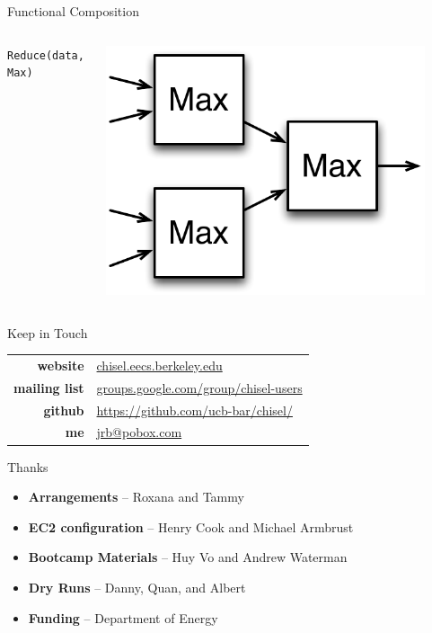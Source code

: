 \documentclass[xcolor=pdflatex,dvipsnames,table]{beamer}
\begin{document}
\begin{frame}[fragile]{Functional Composition}
\begin{columns}
\verb+Reduce(data, Max)+ \\
\begin{center}
\includegraphics[width=0.9\textwidth]{figs/reduce.pdf} \\
\end{center}


\end{columns}
\end{frame}

\begin{frame}[fragile]{Keep in Touch}
\begin{center}
\begin{tabular}{rl}
\textbf{website} & \url{chisel.eecs.berkeley.edu} \\
\textbf{mailing list} & \url{groups.google.com/group/chisel-users} \\
\textbf{github} & \url{https://github.com/ucb-bar/chisel/} \\
\textbf{me} & \url{jrb@pobox.com} \\
\end{tabular}
\end{center}
\end{frame}

\begin{frame}{Thanks}
\begin{itemize}
\item \textbf{Arrangements} -- Roxana and Tammy
\item \textbf{EC2 configuration} -- Henry Cook and Michael Armbrust 
\item \textbf{Bootcamp Materials} -- Huy Vo and Andrew Waterman
\item \textbf{Dry Runs} -- Danny, Quan, and Albert
\item \textbf{Funding} -- Department of Energy
\end{itemize}
\end{frame}
\end{document}
